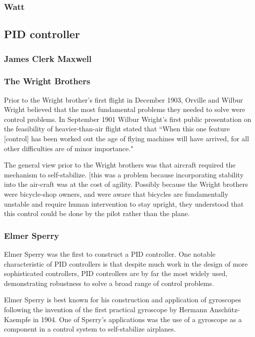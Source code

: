 \subsubsection{Watt}

\subsection{PID controller}

\subsubsection{James Clerk Maxwell}

\subsubsection{The Wright Brothers}

Prior to the Wright brother's first flight in December 1903, Orville and Wilbur Wright believed that
the most fundamental problems they needed to solve were control problems. In September 1901 Wilbur
Wright's first public presentation on the feasibility of heavier-than-air flight stated that ``When
this one feature [control] has been worked out the age of flying machines will have arrived, for all
other difficulties are of minor importance."\cite{wright1908}


The general view prior to the Wright brothers was that aircraft required the mechanism to
self-stabilize. [this was a problem because incorporating stability into the air-craft was at the
cost of agility. Possibly because the Wright brothers were bicycle-shop owners, and were aware that
bicycles are fundamentally unstable and require human intervention to stay upright, they understood
that this control could be done by the pilot rather than the plane.

\subsubsection{Elmer Sperry}

Elmer Sperry was the first to construct a PID controller. One notable characteristic of PID
controllers is that despite much work in the design of more sophisticated controllers, PID
controllers are by far the most widely used, demonstrating robustness to solve a broad range of
control problems.

Elmer Sperry is best known for his construction and application of gyroscopes following the
invention of the first practical gyroscope by Hermann Anschütz-Kaempfe in 1904. One of Sperry's
applications was the use of a gyroscope as a component in a control system to self-stabilize
airplanes.

